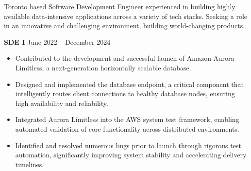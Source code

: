 \documentclass[10pt,a4paper]{altacv}
\begin{document}

\begin{fullwidth}
    \makecvheader
    Toronto based Software Development Engineer experienced in building highly available data-intensive applications across a variety of tech stacks. Seeking a role in an innovative and challenging environment, building world-changing products.
\end{fullwidth}


\vspace{-0.25em}
\textbf{\color{accent}SDE I}
\hfill\small\faCalendar\hspace{0.5em}June 2022 -- December 2024
\normalsize
\medskip
\begin{itemize}
    \item Contributed to the development and successful launch of Amazon Aurora Limitless, a next-generation horizontally scalable database.
    \item Designed and implemented the database endpoint, a critical component that intelligently routes client connections to healthy database nodes, ensuring high availability and reliability.
    \item Integrated Aurora Limitless into the AWS system test framework, enabling automated validation of core functionality across distributed environments.
    \item Identified and resolved numerous bugs prior to launch through rigorous test automation, significantly improving system stability and accelerating delivery timelines.
\end{itemize}

\divider
\end{document}

